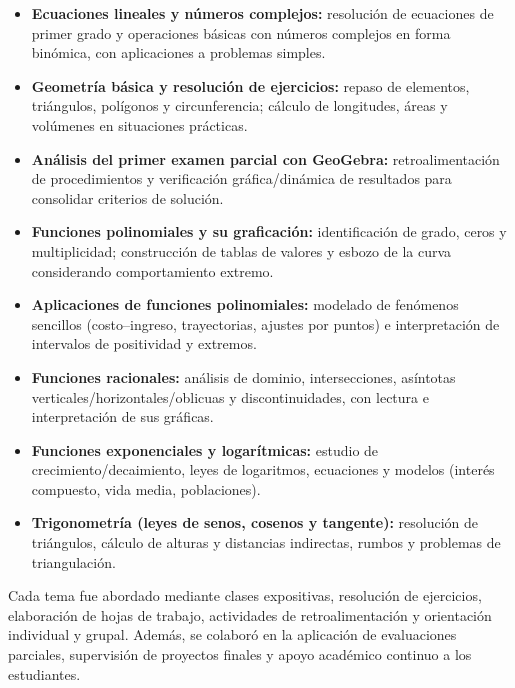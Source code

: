 \documentclass[12pt]{article}
\begin{document}
	
	\begin{itemize}
		\item \textbf{Ecuaciones lineales y números complejos:} resolución de ecuaciones de primer grado y operaciones básicas con números complejos en forma binómica, con aplicaciones a problemas simples.
		\item \textbf{Geometría básica y resolución de ejercicios:} repaso de elementos, triángulos, polígonos y circunferencia; cálculo de longitudes, áreas y volúmenes en situaciones prácticas.
		\item \textbf{Análisis del primer examen parcial con GeoGebra:} retroalimentación de procedimientos y verificación gráfica/dinámica de resultados para consolidar criterios de solución.
		\item \textbf{Funciones polinomiales y su graficación:} identificación de grado, ceros y multiplicidad; construcción de tablas de valores y esbozo de la curva considerando comportamiento extremo.
		\item \textbf{Aplicaciones de funciones polinomiales:} modelado de fenómenos sencillos (costo–ingreso, trayectorias, ajustes por puntos) e interpretación de intervalos de positividad y extremos.
		\item \textbf{Funciones racionales:} análisis de dominio, intersecciones, asíntotas verticales/horizontales/oblicuas y discontinuidades, con lectura e interpretación de sus gráficas.
		\item \textbf{Funciones exponenciales y logarítmicas:} estudio de crecimiento/decaimiento, leyes de logaritmos, ecuaciones y modelos (interés compuesto, vida media, poblaciones).
		\item \textbf{Trigonometría (leyes de senos, cosenos y tangente):} resolución de triángulos, cálculo de alturas y distancias indirectas, rumbos y problemas de triangulación.
	\end{itemize}
	
	
	
	Cada tema fue abordado mediante clases expositivas, resolución de ejercicios, elaboración de hojas de trabajo, actividades de retroalimentación y orientación individual y grupal. Además, se colaboró en la aplicación de evaluaciones parciales, supervisión de proyectos finales y apoyo académico continuo a los estudiantes.
	
\end{document}
